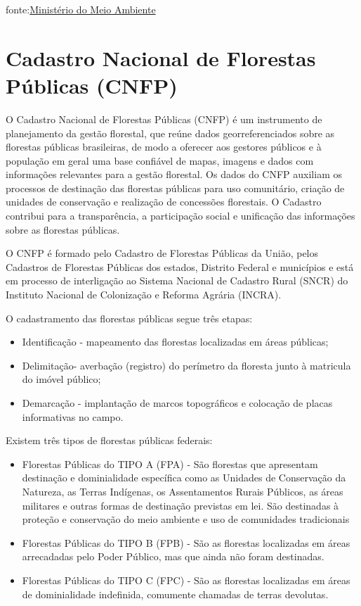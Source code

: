 \documentclass[
  letterpaper,
]{report}
\providecommand{\tightlist}{%
  \setlength{\itemsep}{0pt}\setlength{\parskip}{0pt}}\usepackage{longtable,booktabs,array}
\begin{document}
fonte:\href{https://antigo.mma.gov.br/informma/item/15713-o-que-s\%C3\%A3o-as-unidades-de-conserva\%C3\%A7\%C3\%A3o.html}{Ministério
do Meio Ambiente}

\hypertarget{cadastro-nacional-de-florestas-puxfablicas-cnfp}{%
\section{Cadastro Nacional de Florestas Públicas
(CNFP)}\label{cadastro-nacional-de-florestas-puxfablicas-cnfp}}

O Cadastro Nacional de Florestas Públicas (CNFP) é um instrumento de
planejamento da gestão florestal, que reúne dados georreferenciados
sobre as florestas públicas brasileiras, de modo a oferecer aos gestores
públicos e à população em geral uma base confiável de mapas, imagens e
dados com informações relevantes para a gestão florestal. Os dados do
CNFP auxiliam os processos de destinação das florestas públicas para uso
comunitário, criação de unidades de conservação e realização de
concessões florestais. O Cadastro contribui para a transparência, a
participação social e unificação das informações sobre as florestas
públicas.

O CNFP é formado pelo Cadastro de Florestas Públicas da União, pelos
Cadastros de Florestas Públicas dos estados, Distrito Federal e
municípios e está em processo de interligação ao Sistema Nacional de
Cadastro Rural (SNCR) do Instituto Nacional de Colonização e Reforma
Agrária (INCRA).

O cadastramento das florestas públicas segue três etapas:

\begin{itemize}
\tightlist
\item
  Identificação - mapeamento das florestas localizadas em áreas
  públicas;
\item
  Delimitação- averbação (registro) do perímetro da floresta junto à
  matricula do imóvel público;
\item
  Demarcação - implantação de marcos topográficos e colocação de placas
  informativas no campo.
\end{itemize}

Existem três tipos de florestas públicas federais:

\begin{itemize}
\tightlist
\item
  Florestas Públicas do TIPO A (FPA) - São florestas que apresentam
  destinação e dominialidade específica como as Unidades de Conservação
  da Natureza, as Terras Indígenas, os Assentamentos Rurais Públicos, as
  áreas militares e outras formas de destinação previstas em lei. São
  destinadas à proteção e conservação do meio ambiente e uso de
  comunidades tradicionais
\item
  Florestas Públicas do TIPO B (FPB) - São as florestas localizadas em
  áreas arrecadadas pelo Poder Público, mas que ainda não foram
  destinadas.
\item
  Florestas Públicas do TIPO C (FPC) - São as florestas localizadas em
  áreas de dominialidade indefinida, comumente chamadas de terras
  devolutas.
\end{itemize}
\end{document}
